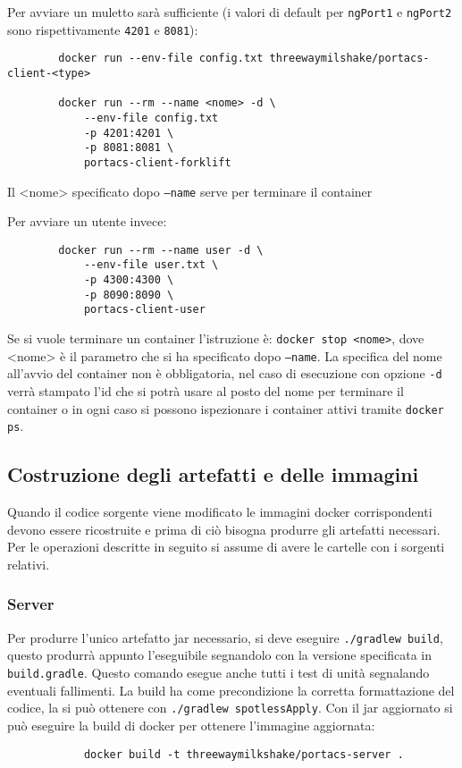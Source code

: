     Per avviare un muletto sarà sufficiente (i valori di default per \texttt{ngPort1} e \texttt{ngPort2} sono rispettivamente \texttt{4201} e \texttt{8081}):
    \begin{verbatim}
        docker run --env-file config.txt threewaymilshake/portacs-client-<type>

        docker run --rm --name <nome> -d \
            --env-file config.txt
            -p 4201:4201 \
            -p 8081:8081 \
            portacs-client-forklift
    \end{verbatim}
    Il <nome> specificato dopo \texttt{--name} serve per terminare il container

    Per avviare un utente invece:
    \begin{verbatim}
        docker run --rm --name user -d \
            --env-file user.txt \
            -p 4300:4300 \
            -p 8090:8090 \
            portacs-client-user
    \end{verbatim}

        Se si vuole terminare un container l'istruzione è: \texttt{docker stop <nome>}, dove <nome> è il parametro che si ha specificato dopo \texttt{---name}. La specifica del nome all'avvio del container non è obbligatoria, nel caso di esecuzione con opzione \texttt{-d} verrà stampato l'id che si potrà usare al posto del nome per terminare il container o in ogni caso si possono ispezionare i container attivi tramite \texttt{docker ps}.

\clearpage
\subsection{Costruzione degli artefatti e delle immagini}
    Quando il codice sorgente viene modificato le immagini docker corrispondenti devono essere ricostruite e prima di ciò bisogna produrre gli artefatti necessari. Per le operazioni descritte in seguito si assume di avere le cartelle con i sorgenti relativi.
    \subsubsection{Server}
        Per produrre l'unico artefatto jar necessario, si deve eseguire \texttt{./gradlew build}, questo produrrà appunto l'eseguibile segnandolo con la versione specificata in \texttt{build.gradle}. Questo comando esegue anche tutti i test di unità segnalando eventuali fallimenti. La build ha come precondizione la corretta formattazione del codice, la si può ottenere con \texttt{./gradlew spotlessApply}.
        Con il jar aggiornato si può eseguire la build di docker per ottenere l'immagine aggiornata:
        \begin{verbatim}
            docker build -t threewaymilkshake/portacs-server .
        \end{verbatim}

